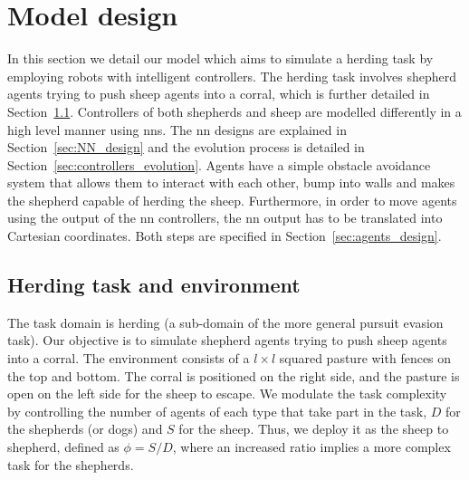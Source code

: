 \documentclass[conference]{IEEEtran}
\begin{document}
\section{Model design}
\label{sec:model_design}
In this section we detail our model which aims to simulate a herding task by employing robots with intelligent controllers.
The herding task involves shepherd agents trying to push sheep agents into a corral, which is further detailed in Section~\ref{sec:herding_task_environment}.
Controllers of both shepherds and sheep are modelled differently in a high level manner using \glspl{nn}.
The \gls{nn} designs are explained in Section~\ref{sec:NN_design} and the evolution process is detailed in Section~\ref{sec:controllers_evolution}.
Agents have a simple obstacle avoidance system that allows them to interact with each other, bump into walls and makes the shepherd capable of herding the sheep.
Furthermore, in order to move agents using the output of the \gls{nn} controllers, the \gls{nn} output has to be translated into Cartesian coordinates.
Both steps are specified in Section~\ref{sec:agents_design}.

\subsection{Herding task and environment}
\label{sec:herding_task_environment}
The task domain is herding (a sub-domain of the more general pursuit evasion task).
Our objective is to simulate shepherd agents trying to push sheep agents into a corral. 
The environment consists of a $l \times l$ squared pasture with fences on the top and bottom.
The corral is positioned on the right side, and the pasture is open on the left side for the sheep to escape.
We modulate the task complexity by controlling the number of agents of each type that take part in the task, $D$ for the shepherds (or dogs) and $S$ for the sheep.
Thus, we deploy it as the sheep to shepherd, defined as $\phi = S / D$, where an increased ratio implies a more complex task for the shepherds.
\end{document}

